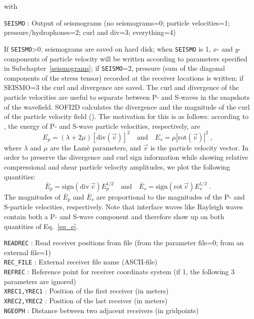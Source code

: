 with

\texttt{SEISMO} : Output of seismograms (no seismograms=0; particle velocities=1; pressure/hydrophones=2; curl and div=3; everything=4)

If \texttt{SEISMO}>0, seismograms are saved on hard disk; when \texttt{SEISMO} is 1, $x$- and $y$-components of particle velocity will be written according to parameters specified in Subchapter~\ref{seismograms}; if \texttt{SEISMO}=2, pressure (sum of the diagonal components of the stress tensor) recorded at the receiver locations is written; if SEISMO=3 the curl and divergence are saved. The curl and divergence of the particle velocities are useful to separate between P- and S-waves in the snapshots of the wavefield. SOFI2D calculates the divergence and the magnitude of the curl of the particle velocity field (\cite{dougherty:88}). The motivation for this is as follows: according to \citet{morse:53}, the energy of P- and S-wave particle velocities, respectively, are
\begin{equation}
    E_p=\left(\lambda + 2 \mu\right) \left[ \text{div}(\vec{v}) \right]^2 \quad \mbox{and} \quad E_s=\mu \left|\text{rot}(\vec{v})\right|^2\;,
    \label{eq_E}
\end{equation}
where $\lambda$ and $\mu$ are the Lam\`{e} parameters, and $\vec{v}$ is the particle velocity vector. In order to preserve the divergence and curl sign information  while showing relative compressional and shear particle velocity amplitudes, we plot the following quantities:
\begin{equation}
    \bar{E}_p = \text{sign}(\text{div}\,\vec{v}) E_p^{1/2} \quad \mbox{and} \quad \bar{E}_s= \text{sign}(\text{rot}\,\vec{v}) E_s^{1/2}\;.
    \label{eq_e}
\end{equation}
The magnitudes of $\bar{E}_p$ and $\bar{E}_s$ are proportional to the magnitudes of the P- and S-particle velocities, respectively. Note that interface waves like Rayleigh waves contain both a P- and S-wave component and therefore show up on both quantities of Eq.~\ref{eq_e}.

\texttt{READREC} : Read receiver positions from file (from the parameter file=0; from an external file=1)\\
\texttt{REC\_FILE} : External receiver file name (ASCII-file)\\
\texttt{REFREC} : Reference point for receiver coordinate system (if 1, the following 3 parameters are ignored)\\
\texttt{XREC1,YREC1} : Position of the first receiver (in meters) \\
\texttt{XREC2,YREC2} : Position of the last receiver (in meters)\\
\texttt{NGEOPH} : Distance between two adjacent receivers (in gridpoints)

